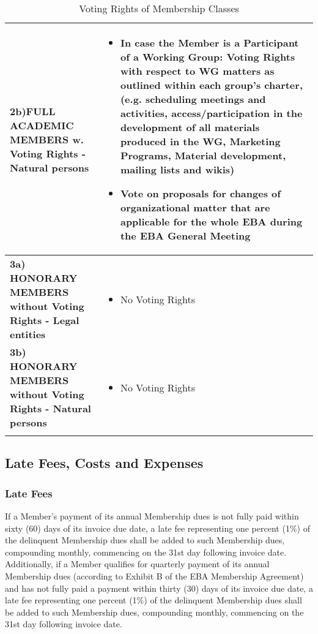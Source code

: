 \documentclass{article}
\begin{document}
\begin{longtable}{| p{} | p{} |}
   	\textbf{2b)FULL ACADEMIC MEMBERS w. Voting Rights - Natural persons} &
   	\begin{itemize}
   		\item In case the Member is a Participant of a Working Group: Voting Rights with respect to WG matters as outlined within each group's charter, (e.g. scheduling meetings and activities, access/participation in the development of all materials produced in the WG, Marketing Programs, Material development, mailing lists and wikis)
   		\item Vote on proposals for changes of organizational matter that are applicable for the whole EBA during the EBA General Meeting
   	\end{itemize}\\ \hline
    	
   	\textbf{3a) HONORARY MEMBERS without Voting Rights - Legal entities} &
   	\begin{itemize}
   		\item No Voting Rights
   	\end{itemize}\\ \hline
    	
   	\textbf{3b) HONORARY MEMBERS without Voting Rights - Natural persons} &
   	\begin{itemize}
   		\item No Voting Rights
   	\end{itemize}\\ \hline 
	    	
	\caption{Voting Rights of Membership Classes}
	\label{table:Mem_Voting}
\end{longtable}

\subsection{Late Fees, Costs and Expenses}

\subsubsection{Late Fees}

If a Member’s payment of its annual Membership dues is not fully paid within sixty (60) days of its invoice due date, a late fee representing one percent (1\%) of the delinquent Membership dues shall be added to such Membership dues, compounding monthly, commencing on the 31st day following invoice date. 
Additionally, if a Member qualifies for quarterly payment of its annual Membership dues (according to Exhibit B of the EBA Membership Agreement) and has not fully paid a payment within thirty (30) days of its invoice due date, a late fee representing one percent (1\%) of the delinquent Membership dues shall be added to such Membership dues, compounding monthly, commencing on the 31st day following invoice date.
\end{document}
